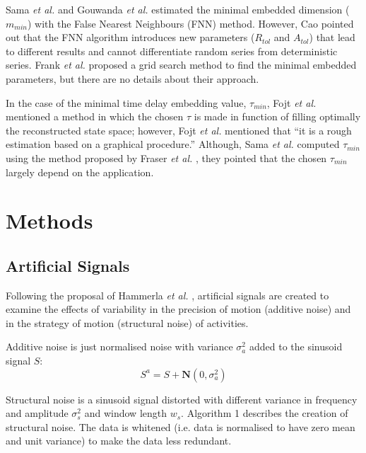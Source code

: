 \documentclass[10pt,journal,compsoc]{IEEEtran}
\begin{document}
Sama \emph{et al.} \cite{Sama2013} and Gouwanda \emph{et al.} \cite{Gouwanda2012}
estimated the minimal embedded dimension ($m_{min}$) 
with the False Nearest Neighbours (FNN) method. However, Cao \cite{Cao1997} pointed out that 
the FNN algorithm introduces new parameters ($R_{tol}$ and $A_{tol}$) that lead 
to different results and  cannot differentiate random series from deterministic series. 
Frank \emph{et al.} \cite{Frank2010} proposed a grid search method to find the minimal 
embedded parameters, but there are no details about their approach.

In the case of the minimal time delay embedding value, $\tau_{min}$,
Fojt \emph{et al.} \cite{Fojt1998} mentioned a method in which the chosen $\tau$ 
is made in function of filling optimally the reconstructed state space;
however, Fojt \emph{et al.} \cite{Fojt1998} mentioned
that ``it is a rough estimation based on a graphical procedure.''
Although, Sama \emph{et al.} \cite{Sama2013} computed $\tau_{min}$ using 
the method proposed by Fraser \emph{et al.} \cite{Fraser1986}, 
they pointed that the chosen $\tau_{min}$ largely depend on the application.


\section{Methods}
\subsection{Artificial Signals}

Following the proposal of Hammerla \emph{et al.} \cite{hammerla2011},
artificial signals are created to examine the effects of
variability in the precision of motion  (additive noise) 
and in the strategy of motion  (structural noise) of 
activities.

Additive noise is just normalised noise with variance $\sigma_a ^2$ added to the
sinusoid signal $S$: 
\begin{equation}
 S^a = S + \textbf{N}(0, \sigma_a ^2)
\end{equation} 

Structural noise is a sinusoid signal distorted with different variance in frequency and amplitude
$\sigma_s ^2$ and window length $w_s$. Algorithm 1 describes the creation of structural noise.
The data is whitened (i.e. data is normalised to have zero mean and unit variance) 
to make the data less redundant.
\end{document}
